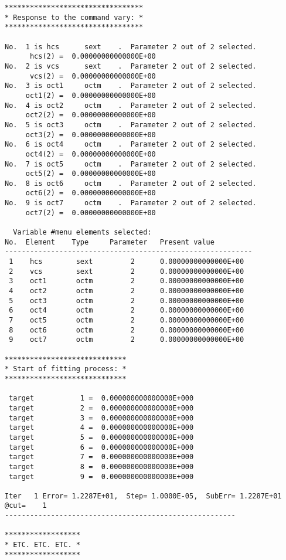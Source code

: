 \begin{footnotesize}
\begin{verbatim}
*********************************
* Response to the command vary: *
*********************************

No.  1 is hcs      sext    .  Parameter 2 out of 2 selected.
      hcs(2) =  0.00000000000000E+00
No.  2 is vcs      sext    .  Parameter 2 out of 2 selected.
      vcs(2) =  0.00000000000000E+00
No.  3 is oct1     octm    .  Parameter 2 out of 2 selected.
     oct1(2) =  0.00000000000000E+00
No.  4 is oct2     octm    .  Parameter 2 out of 2 selected.
     oct2(2) =  0.00000000000000E+00
No.  5 is oct3     octm    .  Parameter 2 out of 2 selected.
     oct3(2) =  0.00000000000000E+00
No.  6 is oct4     octm    .  Parameter 2 out of 2 selected.
     oct4(2) =  0.00000000000000E+00
No.  7 is oct5     octm    .  Parameter 2 out of 2 selected.
     oct5(2) =  0.00000000000000E+00
No.  8 is oct6     octm    .  Parameter 2 out of 2 selected.
     oct6(2) =  0.00000000000000E+00
No.  9 is oct7     octm    .  Parameter 2 out of 2 selected.
     oct7(2) =  0.00000000000000E+00

  Variable #menu elements selected:
No.  Element    Type     Parameter   Present value
-----------------------------------------------------------
 1    hcs        sext         2      0.00000000000000E+00
 2    vcs        sext         2      0.00000000000000E+00
 3    oct1       octm         2      0.00000000000000E+00
 4    oct2       octm         2      0.00000000000000E+00
 5    oct3       octm         2      0.00000000000000E+00
 6    oct4       octm         2      0.00000000000000E+00
 7    oct5       octm         2      0.00000000000000E+00
 8    oct6       octm         2      0.00000000000000E+00
 9    oct7       octm         2      0.00000000000000E+00

*****************************
* Start of fitting process: *
*****************************

 target           1 =  0.000000000000000E+000
 target           2 =  0.000000000000000E+000
 target           3 =  0.000000000000000E+000
 target           4 =  0.000000000000000E+000
 target           5 =  0.000000000000000E+000
 target           6 =  0.000000000000000E+000
 target           7 =  0.000000000000000E+000
 target           8 =  0.000000000000000E+000
 target           9 =  0.000000000000000E+000

Iter   1 Error= 1.2287E+01,  Step= 1.0000E-05,  SubErr= 1.2287E+01 @cut=    1
-------------------------------------------------------

******************
* ETC. ETC. ETC. *
******************


\end{verbatim}
\end{footnotesize}
